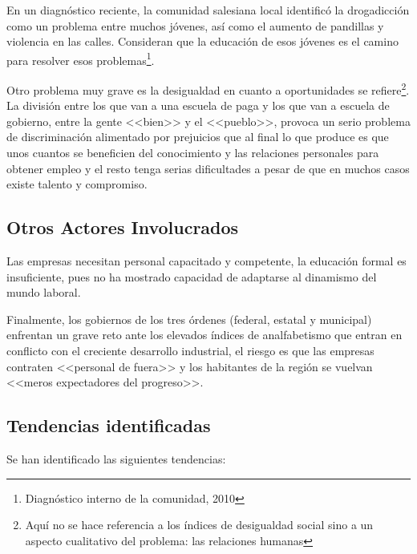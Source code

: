 En un diagnóstico reciente, la comunidad salesiana local identificó la drogadicción como un problema entre muchos jóvenes, así como el aumento de pandillas y violencia en las calles. Consideran que la educación de esos jóvenes es el camino para resolver esos problemas\footnote{Diagnóstico interno de la comunidad, 2010}.

Otro problema muy grave es la desigualdad en cuanto a oportunidades se refiere\footnote{Aquí no se hace referencia a los índices de desigualdad social sino a un aspecto cualitativo del problema: las relaciones humanas}. La división entre los que van a una escuela de paga y los que van a escuela de gobierno, entre la gente <<bien>> y el <<pueblo>>, provoca un serio problema de discriminación alimentado por prejuicios que al final lo que produce es que unos cuantos se beneficien del conocimiento y las relaciones personales para obtener empleo y el resto tenga serias dificultades a pesar de que en muchos casos existe talento y compromiso.

\subsection{Otros Actores Involucrados}

Las empresas necesitan personal capacitado y competente, la educación formal es insuficiente, pues no ha mostrado capacidad de adaptarse al dinamismo del mundo laboral.

Finalmente, los gobiernos de los tres órdenes (federal, estatal y municipal) enfrentan un grave reto ante los elevados índices de analfabetismo que entran en conflicto con el creciente desarrollo industrial, el riesgo es que las empresas contraten <<personal de fuera>> y los habitantes de la región se vuelvan <<meros expectadores del progreso>>.

\subsection{Tendencias identificadas}

Se han identificado las siguientes tendencias:

